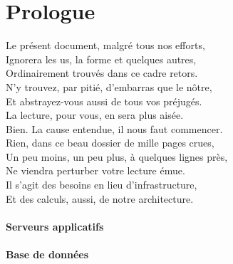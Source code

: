 
\usepackage{float}




\section{Prologue}

Le présent document, malgré tous nos efforts, \\
Ignorera les us, la forme et quelques autres,  \\
Ordinairement trouvés dans ce cadre retors. \\
N'y trouvez, par pitié, d'embarras que le nôtre, \\
Et abstrayez-vous aussi de tous vos préjugés. \\
La lecture, pour vous, en sera plus aisée. \\

Bien. La cause entendue, il nous faut commencer. \\
Rien, dans ce beau dossier de mille pages crues, \\
Un peu moins, un peu plus, à quelques lignes près, \\
Ne viendra perturber votre lecture émue. \\
Il s'agit des besoins en lieu d'infrastructure, \\
Et des calculs, aussi, de notre architecture. \\

\paragraph{Serveurs applicatifs}



\paragraph{Base de données}

\section{}



